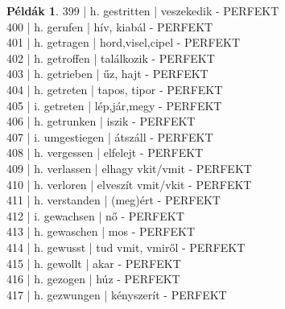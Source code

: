 \documentclass{article}
\theoremstyle{definition}
\newtheorem*{exmp}{Példák}
\begin{document}
\begin{exmp}
399 | h. gestritten | veszekedik - PERFEKT\\
400 | h. gerufen | hív, kiabál - PERFEKT\\
401 | h. getragen | hord,visel,cipel - PERFEKT\\
402 | h. getroffen | találkozik - PERFEKT\\
403 | h. getrieben | űz, hajt - PERFEKT\\
404 | h. getreten | tapos, tipor - PERFEKT\\
405 | i.  getreten | lép,jár,megy - PERFEKT\\
406 | h. getrunken | iszik - PERFEKT\\
407 | i. umgestiegen | átszáll - PERFEKT\\
408 | h. vergessen | elfelejt - PERFEKT\\
409 | h. verlassen | elhagy vkit/vmit - PERFEKT\\
410 | h. verloren | elveszít vmit/vkit - PERFEKT\\
411 | h. verstanden | (meg)ért - PERFEKT\\
412 | i. gewachsen | nő - PERFEKT\\
413 | h. gewaschen | mos - PERFEKT\\
414 | h. gewusst | tud vmit, vmiről - PERFEKT\\
415 | h. gewollt | akar - PERFEKT\\
416 | h. gezogen | húz - PERFEKT\\
417 | h. gezwungen | kényszerít - PERFEKT\\
\end{exmp}
\end{document}
